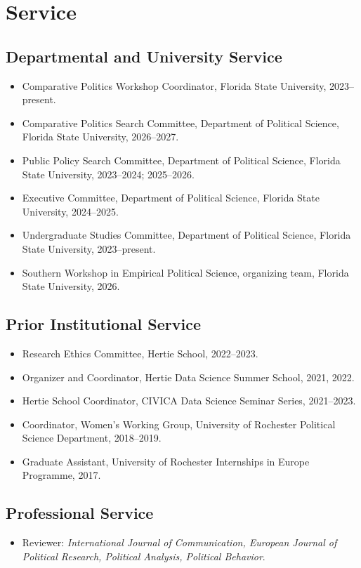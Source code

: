 \documentclass[10pt]{article}
\begin{document}
\section{Service}

\subsection{Departmental and University Service}
\begin{itemize}
    \item Comparative Politics Workshop Coordinator, Florida State University, 2023--present.
    \item Comparative Politics Search Committee, Department of Political Science, Florida State University, 2026--2027.
    \item Public Policy Search Committee, Department of Political Science, Florida State University, 2023--2024; 2025--2026.
    \item Executive Committee, Department of Political Science, Florida State University, 2024--2025.
    \item Undergraduate Studies Committee, Department of Political Science, Florida State University, 2023--present.
    \item Southern Workshop in Empirical Political Science, organizing team, Florida State University, 2026.
\end{itemize}

\subsection{Prior Institutional Service}
\begin{itemize}
    \item Research Ethics Committee, Hertie School, 2022--2023.
    \item Organizer and Coordinator, Hertie Data Science Summer School, 2021, 2022.
    \item Hertie School Coordinator, CIVICA Data Science Seminar Series, 2021--2023.
    \item Coordinator, Women's Working Group, University of Rochester Political Science Department, 2018--2019.
    \item Graduate Assistant, University of Rochester Internships in Europe Programme, 2017.
\end{itemize}

\subsection{Professional Service}
\begin{itemize}
    \item Reviewer: \textit{International Journal of Communication, European Journal of Political Research, Political Analysis, Political Behavior}.
\end{itemize}
\end{document}
